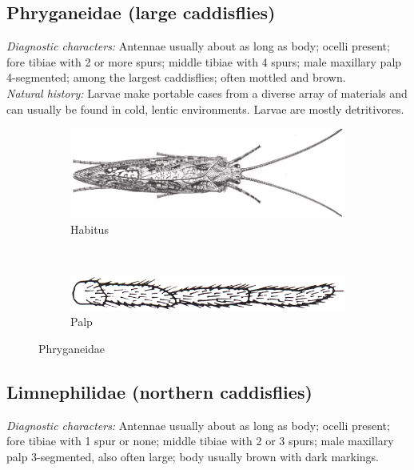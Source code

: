 \documentclass[letterpaper, 11pt]{article}
\begin{document}
\subsection{Phryganeidae (large caddisflies)}
\noindent{}\textit{Diagnostic characters:} Antennae usually about as long as body; ocelli present; fore tibiae with 2 or more spurs; middle tibiae with 4 spurs; male maxillary palp 4-segmented; among the largest caddisflies; often mottled and brown.\\

\noindent{}\textit{Natural history:} Larvae make portable cases from a diverse array of materials and can usually be found in cold, lentic environments. Larvae are mostly detritivores.

\begin{figure}[ht!]
    \centering
    \begin{subfigure}[ht!]{0.6\textwidth}
        \includegraphics[width=\textwidth]{TrichoImage00}
        \caption{Habitus}
        \label{fig:phrygan1}
    \end{subfigure}
    ~ %
    \begin{subfigure}[ht!]{0.25\textwidth}
        \includegraphics[width=\textwidth]{TrichoImage01}
        \caption{Palp}
        \label{fig:phrygan2}
    \end{subfigure}
    \caption{Phryganeidae}\label{fig:phrygan}
\end{figure}

\subsection{Limnephilidae (northern caddisflies)}
\noindent{}\textit{Diagnostic characters:} Antennae usually about as long as body; ocelli present; fore tibiae with 1 spur or none; middle tibiae with 2 or 3 spurs; male maxillary palp 3-segmented, also often large; body usually brown with dark markings.\\ 
\end{document}
